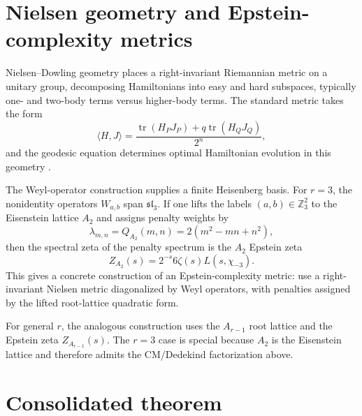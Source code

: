 \documentclass[11pt]{article}
\theoremstyle{remark}
\DeclareMathOperator{\tr}{tr}
\newcommand{\ZZ}{\mathbb Z}
\begin{document}
\section{Nielsen geometry and Epstein-complexity metrics}

Nielsen--Dowling geometry places a right-invariant Riemannian metric on a unitary group, decomposing Hamiltonians into easy and hard subspaces, typically one- and two-body terms versus higher-body terms.  The standard metric takes the form
\[
        \langle H,J\rangle
        =\frac{\tr(H_PJ_P)+q\tr(H_QJ_Q)}{2^n},
\]
and the geodesic equation determines optimal Hamiltonian evolution in this geometry \cite{NielsenDowling}.

The Weyl-operator construction supplies a finite Heisenberg basis.  For $r=3$, the nonidentity operators $W_{a,b}$ span $\mathfrak{sl}_3$.  If one lifts the labels $(a,b)\in\ZZ_3^2$ to the Eisenstein lattice $A_2$ and assigns penalty weights by
\[
        \lambda_{m,n}=Q_{A_2}(m,n)=2(m^2-mn+n^2),
\]
then the spectral zeta of the penalty spectrum is the $A_2$ Epstein zeta
\[
        Z_{A_2}(s)=2^{-s}6\zeta(s)L(s,\chi_{-3}).
\]
This gives a concrete construction of an Epstein-complexity metric: use a right-invariant Nielsen metric diagonalized by Weyl operators, with penalties assigned by the lifted root-lattice quadratic form.

For general $r$, the analogous construction uses the $A_{r-1}$ root lattice and the Epstein zeta $Z_{A_{r-1}}(s)$.  The $r=3$ case is special because $A_2$ is the Eisenstein lattice and therefore admits the CM/Dedekind factorization above.

\section{Consolidated theorem}
\end{document}
